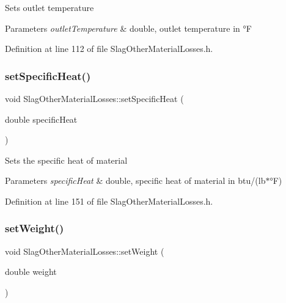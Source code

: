 Sets outlet temperature


\begin{DoxyParams}{Parameters}
{\em outlet\+Temperature} & double, outlet temperature in °F \\
\hline
\end{DoxyParams}


Definition at line 112 of file Slag\+Other\+Material\+Losses.\+h.

\mbox{\label{class_slag_other_material_losses_a05488997f264a74afe3229250a286f92}} 
\subsubsection{\texorpdfstring{set\+Specific\+Heat()}{setSpecificHeat()}}
{\footnotesize\ttfamily void Slag\+Other\+Material\+Losses\+::set\+Specific\+Heat (\begin{DoxyParamCaption}\item[{double}]{specific\+Heat }\end{DoxyParamCaption})\hspace{0.3cm}{\ttfamily [inline]}}

Sets the specific heat of material


\begin{DoxyParams}{Parameters}
{\em specific\+Heat} & double, specific heat of material in btu/(lb$\ast$°F) \\
\hline
\end{DoxyParams}


Definition at line 151 of file Slag\+Other\+Material\+Losses.\+h.

\mbox{\label{class_slag_other_material_losses_a230a178f2ead59cd498b620e4bb4910f}} 
\subsubsection{\texorpdfstring{set\+Weight()}{setWeight()}}
{\footnotesize\ttfamily void Slag\+Other\+Material\+Losses\+::set\+Weight (\begin{DoxyParamCaption}\item[{double}]{weight }\end{DoxyParamCaption})\hspace{0.3cm}{\ttfamily [inline]}}

